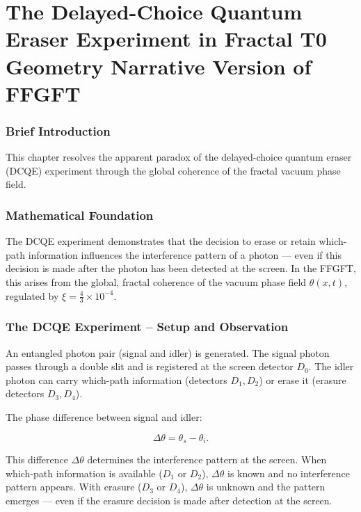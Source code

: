 \chapter{The Delayed-Choice Quantum Eraser Experiment in Fractal T0 Geometry  Narrative Version of FFGFT}


	
	\subsection*{Brief Introduction}
	
	This chapter resolves the apparent paradox of the delayed-choice quantum eraser (DCQE) experiment through the global coherence of the fractal vacuum phase field.
	
	\subsection*{Mathematical Foundation}
	
	The DCQE experiment demonstrates that the decision to erase or retain which-path information influences the interference pattern of a photon — even if this decision is made after the photon has been detected at the screen. In the FFGFT, this arises from the global, fractal coherence of the vacuum phase field \(\theta(x,t)\), regulated by \(\xi = \frac{4}{3} \times 10^{-4}\).
	
	\subsection*{The DCQE Experiment – Setup and Observation}
	
	An entangled photon pair (signal and idler) is generated. The signal photon passes through a double slit and is registered at the screen detector \(D_0\). The idler photon can carry which-path information (detectors \(D_1, D_2\)) or erase it (erasure detectors \(D_3, D_4\)).
	
	The phase difference between signal and idler:
	
	\begin{equation}
		\Delta \theta = \theta_s - \theta_i.
	\end{equation}
	
	This difference \(\Delta \theta\) determines the interference pattern at the screen. When which-path information is available (\(D_1\) or \(D_2\)), \(\Delta \theta\) is known and no interference pattern appears. With erasure (\(D_3\) or \(D_4\)), \(\Delta \theta\) is unknown and the pattern emerges — even if the erasure decision is made after detection at the screen.
	

